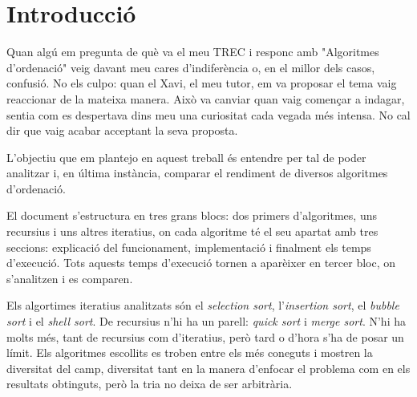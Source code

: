 \chapter{Introducció}
Quan algú em pregunta de què va el meu TREC i responc amb "Algoritmes d'ordenació" veig davant meu cares d'indiferència o, en el millor dels casos, confusió.
No els culpo: quan el Xavi, el meu tutor, em va proposar el tema vaig reaccionar de la mateixa manera.
Això va canviar quan vaig començar a indagar, sentia com es despertava dins meu una curiositat cada vegada més intensa. 
No cal dir que vaig acabar acceptant la seva proposta.

L'objectiu que em plantejo en aquest treball és entendre per tal de poder analitzar i, en última instància, comparar el rendiment de diversos algoritmes d'ordenació.

El document s'estructura en tres grans blocs: dos primers d'algoritmes, uns recursius i uns altres iteratius, on cada algoritme té el seu apartat amb tres seccions: explicació del funcionament, implementació i finalment els temps d'execució. Tots aquests temps d'execució tornen a aparèixer en tercer bloc, on s'analitzen i es comparen.

Els algortimes iteratius analitzats són el \textit{selection sort}, l'\textit{insertion sort}, el \textit{bubble sort} i el \textit{shell sort}. De recursius n'hi ha un parell: \textit{quick sort} i \textit{merge sort}. N'hi ha molts més, tant de recursius com d'iteratius, però tard o d'hora s'ha de posar un límit. Els algoritmes escollits es troben entre els més coneguts i mostren la diversitat del camp, diversitat tant en la manera d'enfocar el problema com en els resultats obtinguts, però la tria no deixa de ser arbitrària.